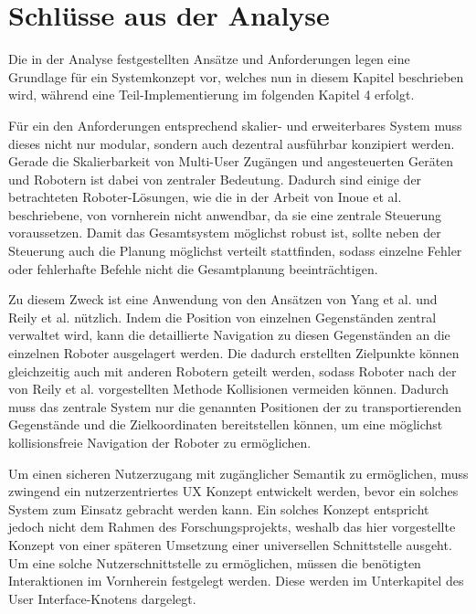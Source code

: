 \section{Schlüsse aus der Analyse}

Die in der Analyse festgestellten Ansätze und Anforderungen legen eine Grundlage für ein Systemkonzept vor, welches nun in diesem Kapitel beschrieben wird, während eine Teil-Implementierung im folgenden Kapitel 4 erfolgt.

Für ein den Anforderungen entsprechend skalier- und erweiterbares System muss dieses nicht nur modular, sondern auch dezentral ausführbar konzipiert werden. Gerade die Skalierbarkeit von Multi-User Zugängen und angesteuerten Geräten und Robotern ist dabei von zentraler Bedeutung. Dadurch sind einige der betrachteten Roboter-Lösungen, wie die in der Arbeit von Inoue et al. \cite{meanField} beschriebene, von vornherein nicht anwendbar, da sie eine zentrale Steuerung voraussetzen. Damit das Gesamtsystem möglichst robust ist, sollte neben der Steuerung auch die Planung möglichst verteilt stattfinden, sodass einzelne Fehler oder fehlerhafte Befehle nicht die Gesamtplanung beeinträchtigen.

Zu diesem Zweck ist eine Anwendung von den Ansätzen von Yang et al. \cite{2DPlan} und Reily et al. \cite{silentSwarm} nützlich. Indem die Position von einzelnen Gegenständen zentral verwaltet wird, kann die detaillierte Navigation zu diesen Gegenständen an die einzelnen Roboter ausgelagert werden. Die dadurch erstellten Zielpunkte können gleichzeitig auch mit anderen Robotern geteilt werden, sodass Roboter nach der von Reily et al. \cite{silentSwarm} vorgestellten Methode Kollisionen vermeiden können. Dadurch muss das zentrale System nur die genannten Positionen der zu transportierenden Gegenstände und die Zielkoordinaten bereitstellen können, um eine möglichst kollisionsfreie Navigation der Roboter zu ermöglichen.

Um einen sicheren Nutzerzugang mit zugänglicher Semantik zu ermöglichen, muss zwingend ein nutzerzentriertes UX Konzept entwickelt werden, bevor ein solches System zum Einsatz gebracht werden kann. Ein solches Konzept entspricht jedoch nicht dem Rahmen des Forschungsprojekts, weshalb das hier vorgestellte Konzept von einer späteren Umsetzung einer universellen Schnittstelle ausgeht. Um eine solche Nutzerschnittstelle zu ermöglichen, müssen die benötigten Interaktionen im Vornherein festgelegt werden. Diese werden im Unterkapitel des User Interface-Knotens dargelegt.


